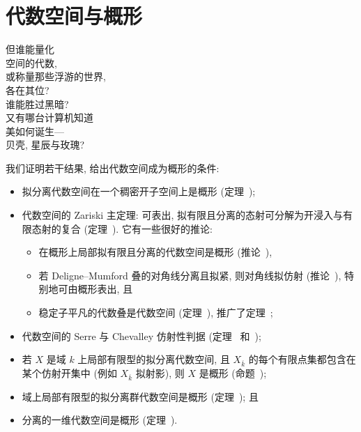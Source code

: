 \section{代数空间与概形}\label{src:5.5}
\begin{epigraph}
但谁能量化\\
空间的代数,\\
或称量那些浮游的世界,\\
各在其位?\\
谁能胜过黑暗?\\
又有哪台计算机知道\\
美如何诞生---\\
贝壳, 星辰与玫瑰?
\end{epigraph}
我们证明若干结果, 给出代数空间成为概形的条件:
\begin{itemize}
\item 拟分离代数空间在一个稠密开子空间上是概形 (定理~);
\item 代数空间的 Zariski 主定理: 可表出, 拟有限且分离的态射可分解为开浸入与有限态射的复合 (定理~). 它有一些很好的推论:
\begin{itemize}
\item 在概形上局部拟有限且分离的代数空间是概形 (推论~),
\item 若 Deligne--Mumford 叠的对角线分离且拟紧, 则对角线拟仿射 (推论~), 特别地可由概形表出, 且
\item 稳定子平凡的代数叠是代数空间 (定理~), 推广了定理~;
\end{itemize}
\item 代数空间的 Serre 与 Chevalley 仿射性判据 (定理~ 和~);
\item 若 $X$ 是域 $k$ 上局部有限型的拟分离代数空间, 且 $X_{\overline k}$ 的每个有限点集都包含在某个仿射开集中 (例如 $X_{\overline k}$ 拟射影), 则 $X$ 是概形 (命题~);
\item 域上局部有限型的拟分离群代数空间是概形 (定理~); 且
\item 分离的一维代数空间是概形 (定理~).
\end{itemize}

